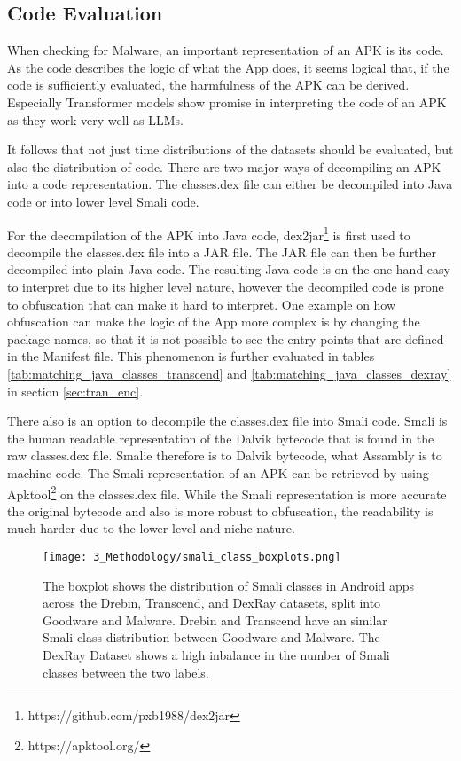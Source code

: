 \newpage

\subsection{Code Evaluation}

When checking for Malware, an important representation of an APK is its code.
As the code describes the logic of what the App does, it seems logical that, if the 
code is sufficiently evaluated, the harmfulness of the APK can be derived.
Especially Transformer models show promise in interpreting the code of an APK as they work very well as LLMs.

It follows that not just time distributions of the datasets should be evaluated, but also the distribution of code.
There are two major ways of decompiling an APK into a code representation.
The classes.dex file can either be decompiled into Java code or into lower level Smali code.

For the decompilation of the APK into Java code, dex2jar\footnote{https://github.com/pxb1988/dex2jar} is first used to decompile the classes.dex file into a JAR file.
The JAR file can then be further decompiled into plain Java code. 
The resulting Java code is on the one hand easy to interpret due to its higher level nature, 
however the decompiled code is prone to obfuscation that can make it hard to interpret.
One example on how obfuscation can make the logic of the App more complex is by changing the package names, 
so that it is not possible to see the entry points that are defined in the Manifest file. 
This phenomenon is further evaluated in tables \ref{tab:matching_java_classes_transcend} and \ref{tab:matching_java_classes_dexray} in section
\ref{sec:tran_enc}.

There also is an option to decompile the classes.dex file into Smali code.
Smali is the human readable representation of the Dalvik bytecode that is found in the raw classes.dex file.
Smalie therefore is to Dalvik bytecode, what Assambly is to machine code.
The Smali representation of an APK can be retrieved by using Apktool\footnote{https://apktool.org/} on the classes.dex file.
While the Smali representation is more accurate the original bytecode and also is more robust to obfuscation, 
the readability is much harder due to the lower level and niche nature.

\begin{figure*}[b!]
    \centering
    \begin{minipage}{1.5\textwidth}
        \centering
        \texttt{[image: 3\_Methodology/smali\_class\_boxplots.png]}
        \captionsetup{width=\textwidth}
        \caption{\label{fig:smali_class_boxplots}
        The boxplot shows the distribution of Smali classes in Android apps 
        across the Drebin, Transcend, and DexRay datasets, 
        split into Goodware and Malware. 
        Drebin and Transcend have an similar Smali class distribution 
        between Goodware and Malware.
        The DexRay Dataset shows a high inbalance in the number of Smali classes 
        between the two labels.
        }
    \end{minipage}
\end{figure*}

